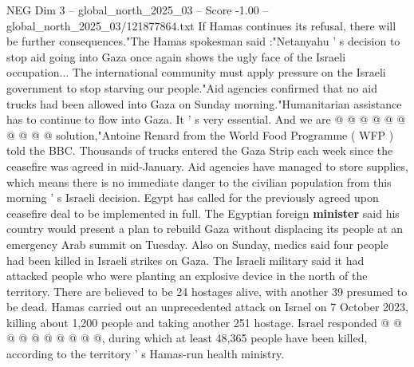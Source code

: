\begin{textsample}{NEG Dim 3 – global\_north\_2025\_03 – Score -1.00 – global\_north\_2025\_03/121877864.txt}
If Hamas continues its refusal, there will be further consequences."The Hamas spokesman said :"Netanyahu ' s decision to stop aid going into Gaza once again shows the ugly face of the Israeli occupation...
The international community must apply pressure on the Israeli government to stop starving our people."Aid agencies confirmed that no aid trucks had been allowed into Gaza on Sunday morning."Humanitarian assistance has to continue to flow into Gaza.
It ' s very essential.
And we are @ @ @ @ @ @ @ @ @ @ solution,"Antoine Renard from the World Food Programme ( WFP ) told the BBC.
Thousands of trucks entered the Gaza Strip each week since the ceasefire was agreed in mid-January.
Aid agencies have managed to store supplies, which means there is no immediate danger to the civilian population from this morning ' s Israeli decision.
Egypt has called for the previously agreed upon ceasefire deal to be implemented in full.
The Egyptian foreign \textbf{minister} said his country would present a plan to rebuild Gaza without displacing its people at an emergency Arab summit on Tuesday.
Also on Sunday, medics said four people had been killed in Israeli strikes on Gaza.
The Israeli military said it had attacked people who were planting an explosive device in the north of the territory.
There are believed to be 24 hostages alive, with another 39 presumed to be dead.
Hamas carried out an unprecedented attack on Israel on 7 October 2023, killing about 1,200 people and taking another 251 hostage.
Israel responded @ @ @ @ @ @ @ @ @ @, during which at least 48,365 people have been killed, according to the territory ' s Hamas-run health ministry.

\end{textsample}
